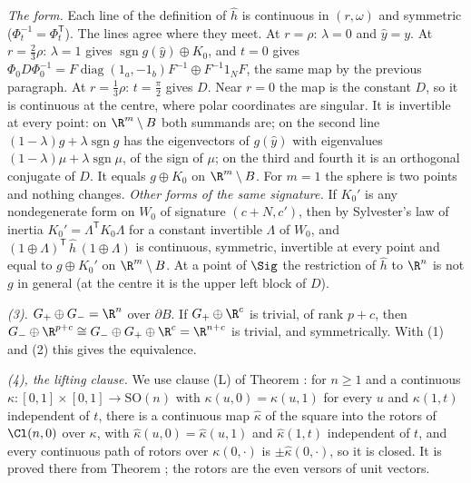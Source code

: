 \emph{The form.} Each line of the definition of $\hat h$ is continuous in $(r, \omega)$ and symmetric ($\Phi_{t}^{-1} = \Phi_{t}^{\mathsf T}$). The lines agree where they meet. At $r = \rho$: $\lambda = 0$ and $\hat y = y$. At $r = \tfrac23\rho$: $\lambda = 1$ gives $\operatorname{sgn} g(\hat y) \oplus K_{0}$, and $t = 0$ gives $\Phi_{0}D\Phi_{0}^{-1} = F\operatorname{diag}(1_{a}, -1_{b})F^{-1} \oplus F^{-1}1_{N}F$, the same map by the previous paragraph. At $r = \tfrac13\rho$: $t = \tfrac\pi2$ gives $D$. Near $r = 0$ the map is the constant $D$, so it is continuous at the centre, where polar coordinates are singular. It is invertible at every point: on $\R^{m} \setminus B$ both summands are; on the second line $(1-\lambda)g + \lambda\operatorname{sgn} g$ has the eigenvectors of $g(\hat y)$ with eigenvalues $(1-\lambda)\mu + \lambda\operatorname{sgn}\mu$, of the sign of $\mu$; on the third and fourth it is an orthogonal conjugate of $D$. It equals $g \oplus K_{0}$ on $\R^{m} \setminus B$. For $m = 1$ the sphere is two points and nothing changes. \emph{Other forms of the same signature.} If $K_{0}'$ is any nondegenerate form on $W_{0}$ of signature $(c + N, c')$, then by Sylvester's law of inertia $K_{0}' = \Lambda^{\mathsf T}K_{0}\Lambda$ for a constant invertible $\Lambda$ of $W_{0}$, and $(1 \oplus \Lambda)^{\mathsf T}\,\hat h\,(1 \oplus \Lambda)$ is continuous, symmetric, invertible at every point and equal to $g \oplus K_{0}'$ on $\R^{m} \setminus B$. At a point of $\Sig$ the restriction of $\hat h$ to $\R^{n}$ is not $g$ in general (at the centre it is the upper left block of $D$).

\emph{(3).} $G_{+} \oplus G_{-} = \R^{n}$ over $\partial B$. If $G_{+} \oplus \R^{c}$ is trivial, of rank $p + c$, then $G_{-} \oplus \R^{p + c} \cong G_{-} \oplus G_{+} \oplus \R^{c} = \R^{n + c}$ is trivial, and symmetrically. With (1) and (2) this gives the equivalence.

\emph{(4), the lifting clause.} We use clause (L) of Theorem : for $n \geq 1$ and a continuous $\kappa \colon [0,1] \times [0,1] \to \mathrm{SO}(n)$ with $\kappa(u,0) = \kappa(u,1)$ for every $u$ and $\kappa(1,t)$ independent of $t$, there is a continuous map $\hat\kappa$ of the square into the rotors of $\Cl(n,0)$ over $\kappa$, with $\hat\kappa(u,0) = \hat\kappa(u,1)$ and $\hat\kappa(1,t)$ independent of $t$, and every continuous path of rotors over $\kappa(0,\cdot)$ is $\pm\hat\kappa(0,\cdot)$, so it is closed. It is proved there from Theorem ; the rotors are the even versors of unit vectors.

